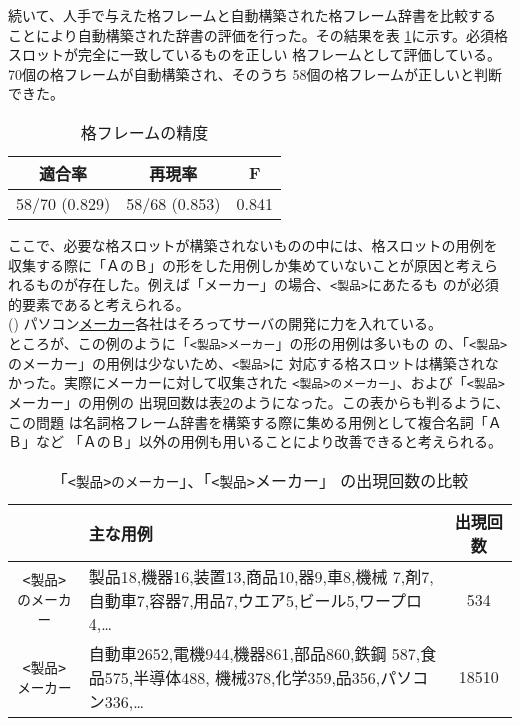 \documentclass{nlp}
\begin{document}
  続いて、人手で与えた格フレームと自動構築された格フレーム辞書を比較する
  ことにより自動構築された辞書の評価を行った。その結果を表
  \ref{evaluation}に示す。必須格スロットが完全に一致しているものを正しい
  格フレームとして評価している。70個の格フレームが自動構築され、そのうち
  58個の格フレームが正しいと判断できた。
 
 \begin{table}[t]
  \small{
  \caption{格フレームの精度}
  \label{evaluation}
  \begin{center}
   \begin{tabular}{c|c|c} \hline
    適合率 & 再現率 & F\\\hline
    58/70 (0.829) & 58/68 (0.853) & 0.841 \\\hline
   \end{tabular}
  \end{center}
  }
 \end{table}
 
 ここで、必要な格スロットが構築されないものの中には、格スロットの用例を
 収集する際に「ＡのＢ」の形をした用例しか集めていないことが原因と考えら
 れるものが存在した。例えば「メーカー」の場合、\texttt{<製品>}にあたるも
 のが必須的要素であると考えられる。
 \vspace{1.5ex}\\
 \hspace{1em}(\theexample)
 パソコン\underline{メーカー}各社はそろってサーバの開発に力を入れている。
 \vspace{1.5ex}\\
 ところが、この例のように「\texttt{<製品>メーカー}」の形の用例は多いもの
 の、「\texttt{<製品>}のメーカー」の用例は少ないため、\texttt{<製品>}に
 対応する格スロットは構築されなかった。実際にメーカーに対して収集された
 \texttt{<製品>のメーカー}」、および「\texttt{<製品>}メーカー」の用例の
 出現回数は表\ref{maker}のようになった。この表からも判るように、この問題
 は名詞格フレーム辞書を構築する際に集める用例として複合名詞「ＡＢ」など
 「ＡのＢ」以外の用例も用いることにより改善できると考えられる。
 
\begin{table}[t]
   \small{
   \caption{「\texttt{<製品>のメーカー}」、「\texttt{<製品>}メーカー」
 の出現回数の比較}
 \label{maker}
 \begin{center}
  \begin{tabularx}{40em}{c|X|c}\hline
   & 主な用例 & 出現回数\\\hline
    \texttt{<製品>のメーカー} & 製品18,機器16,装置13,商品10,器9,車8,機械
   7,剤7,自動車7,容器7,用品7,ウエア5,ビール5,ワープロ4,…
   & 534\\\hline 
   \texttt{<製品>メーカー} & 自動車2652,電機944,機器861,部品860,鉄鋼
   587,食品575,半導体488, 機械378,化学359,品356,パソコン336,… 
   & 18510\\\hline
   \end{tabularx}
 \end{center}
 }
  \end{table}
\end{document}
